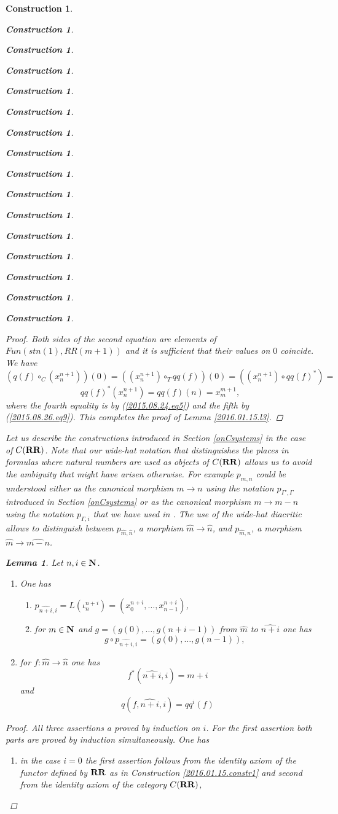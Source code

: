 \documentclass[12pt]{amsart}
\newtheorem{lemma}[proposition]{Lemma}
\newtheorem{construction}[proposition]{Construction}
\newcommand{\llabel}[1]{\label{#1}}
\newcommand{\sr}{\rightarrow}
\newcommand{\nn}{{\bf N\rm}}
\newcommand{\nat}{\nn}
\newcommand{\wh}{\widehat}
\newcommand{\mbind}[1]{{#1^*}}
\newcommand{\RR}{{\bf RR}}
\begin{document}
\begin{construction}
\begin{construction}
\begin{construction}
\begin{construction}
\begin{construction}
\begin{construction}
\begin{construction}
\begin{construction}
\begin{construction}
\begin{construction}
\begin{construction}
\begin{construction}
\begin{construction}
\begin{construction}
\begin{construction}
\begin{construction}
\begin{proof}
Both sides of the second equation are elements of $Fun(stn(1),RR(m+1))$ and it
is sufficient that their values on $0$ coincide. We have
%
$$(q(f)\circ_C (x_n^{n+1}))(0)=((x_n^{n+1})\circ_T qq(f))(0)=((x_n^{n+1})\circ \mbind{qq(f)})=$$$$\mbind{qq(f)}(x_n^{n+1})=qq(f)(n)=x_m^{m+1},$$
%
where the fourth equality is by (\ref{2015.08.24.eq5}) and the fifth by
(\ref{2015.08.26.eq9}). This completes the proof of Lemma \ref{2016.01.15.l3}.
\end{proof}

%
Let us describe the constructions introduced in Section \ref{onCsystems} in the
case of $C(\RR)$. Note that our wide-hat notation that distinguishes the places
in formulas where natural numbers are used as objects of $C(\RR)$ allows us to
avoid the ambiguity that might have arisen otherwise. For example $p_{m,n}$
could be understood either as the canonical morphism $m\sr n$ using the
notation $p_{\Gamma',\Gamma}$ introduced in Section \ref{onCsystems} or as the
canonical morphism $m\sr m-n$ using the notation $p_{\Gamma,i}$ that we have
used in \cite{Csubsystems}.  The use of the wide-hat diacritic allows to
distinguish between $p_{\wh{m},\wh{n}}$, a morphism $\wh{m}\sr \wh{n}$, and
$p_{\wh{m},n}$, a morphism $\wh{m}\sr \wh{m-n}$.
%
\begin{lemma}
\llabel{2015.08.22.l6}
Let $n,i\in\nat$. 
%
\begin{enumerate}
\item One has
%
\begin{enumerate}
\item $p_{\wh{n+i},i}=L(\iota^{n+i}_{n})=(x_0^{n+i},\dots,x_{n-1}^{n+i})$,
\item for $m\in\nat$ and $g=(g(0),\dots,g(n+i-1))$ from $\wh{m}$ to $\wh{n+i}$ one has 
%
$$g\circ p_{\wh{n+i},i}=(g(0),\dots,g(n-1)),$$
%
\end{enumerate}
%
\item for $f:\wh{m}\sr \wh{n}$ one has
%
$$f^*(\wh{n+i},i)=m+i$$
%
and
%
$$q(f,\wh{n+i},i)=qq^i(f)$$
%
\end{enumerate}
\end{lemma}
%
\begin{proof}
All three assertions a proved by induction on $i$. For the first assertion both
parts are proved by induction simultaneously. One has
%
\begin{enumerate}
\item in the case $i=0$ the first assertion follows from the identity axiom of
  the functor defined by $\RR$ as in Construction \ref{2016.01.15.constr1} and
  second from the identity axiom of the category $C(\RR)$,

\end{enumerate}
\end{proof}
\end{construction}
\end{construction}
\end{construction}
\end{construction}
\end{construction}
\end{construction}
\end{construction}
\end{construction}
\end{construction}
\end{construction}
\end{construction}
\end{construction}
\end{construction}
\end{construction}
\end{construction}
\end{construction}
\end{document}
